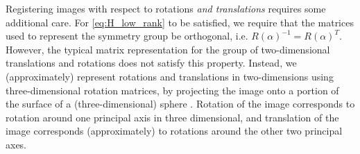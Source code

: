 \documentclass{pnastwo}
\begin{document}
\begin{article}
\begin{materials}
Registering images with respect to rotations {\em and translations} requires some additional care.
%
%
For \eqref{eq:H_low_rank} to be satisfied, we require that the matrices used to represent the symmetry group be orthogonal, i.e. $R(\alpha)^{-1} = R(\alpha)^T$. 
%
However, the typical matrix representation for the group of two-dimensional translations and rotations \cite{...} does not satisfy this property. 
%
Instead, we (approximately) represent rotations and translations in two-dimensions using three-dimensional rotation matrices, by projecting the image onto a portion of the surface of a (three-dimensional) sphere \cite{singer2011angular}. %
%
Rotation of the image corresponds to rotation around one principal axis in three dimensional, and translation of the image corresponds (approximately) to rotations around the other two principal axes. %
%


\end{materials}
\end{article}
\end{document}
